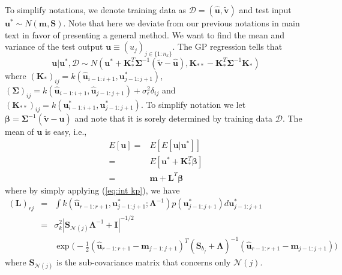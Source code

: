 \documentclass[11pt, reqno]{amsart}
\begin{document}
To simplify notations, we denote training data as $\mathcal{D}=(\hat{\mathbf{u}},\tilde{\mathbf{v}})$ and test input $\mathbf{u}^{*}\sim N(\mathbf{m},\mathbf{S})$. Note that here we deviate from our previous notations in main text in favor of presenting a general method. We want to find the mean and variance of the test output $\mathbf{u}\equiv(u_{j})_{j\in\{1:n_{x}\}}$. The GP regression tells that 
\[
\mathbf{u}\vert\mathbf{u}^{*},\mathcal{D}\sim N(\mathbf{u}^{*}+\mathbf{K}_{*}^{T}\mathbf{\boldsymbol{\Sigma}}^{-1}(\tilde{\mathbf{v}}-\hat{\mathbf{u}}),\mathbf{K}_{**}-\mathbf{K}_{*}^{T}\mathbf{\boldsymbol{\Sigma}}^{-1}\mathbf{K}_{*})
\]
where $(\mathbf{K}_{*})_{ij}=k(\hat{\mathbf{u}}_{i-1:i+1},\mathbf{u}_{j-1:j+1}^{*})$, $(\mathbf{\Sigma})_{ij}=k(\hat{\mathbf{u}}_{i-1:i+1},\hat{\mathbf{u}}_{j-1:j+1})+\sigma_{\epsilon}^{2}\delta_{ij}$ and $(\mathbf{K}_{**})_{ij}=k(\mathbf{u}_{i-1:i+1}^{*},\mathbf{u}_{j-1:j+1}^{*})$. To simplify notation we let $\boldsymbol{\beta}=\boldsymbol{\Sigma}^{-1}(\tilde{\mathbf{v}}-\hat{\mathbf{u}})$ and note that it is sorely determined by training data $\mathcal{D}$. The mean of $\mathbf{u}$ is easy, i.e., 
\begin{align}
E[\mathbf{u}] = & E[E[\mathbf{u}\vert\mathbf{u}^{*}]] \nonumber \\
 = & E[\mathbf{u}^{*}+\mathbf{K}_{*}^{T}\boldsymbol{\beta}] \nonumber \\
 = & \mathbf{m}+\mathbf{L}^{T}\boldsymbol{\beta}\label{eq:E(u)}
\end{align}
where by simply applying (\ref{eq:int kp}), we have
\begin{eqnarray*}
(\mathbf{L})_{rj} & = & \int k(\hat{\mathbf{u}}_{r-1:r+1},\mathbf{u}_{j-1:j+1}^{*};\boldsymbol{\Lambda}^{-1})p(\mathbf{u}_{j-1:j+1}^{*})d\mathbf{u}_{j-1:j+1}^{*} \\
 & = & \sigma_{k}^{2}\left|\mathbf{S}_{\mathcal{N}(j)}\mathbf{\Lambda}^{-1}+\mathbf{I}\right|^{-1/2} \\
 & & \exp\bigg(-\frac{1}{2}(\hat{\mathbf{u}}_{r-1:r+1}-\mathbf{m}_{j-1:j+1})^{T}(\mathbf{S}_{b_{j}}+\mathbf{\Lambda})^{-1}(\hat{\mathbf{u}}_{r-1:r+1}-\mathbf{m}_{j-1:j+1})\bigg) 
\end{eqnarray*}
where $\mathbf{S}_{\mathcal{N}(j)}$ is the sub-covariance matrix that concerns only $\mathcal{N}(j)$.
\end{document}
